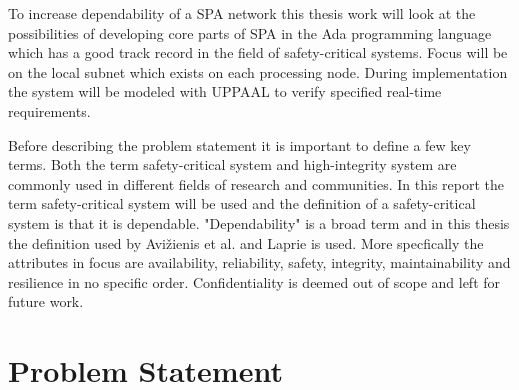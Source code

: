 
To increase dependability of a SPA network this thesis work will look at the
possibilities of developing core parts of SPA in the Ada programming language
which has a good track record in the field of safety-critical systems. Focus
will be on the local subnet which exists on each processing node.
During implementation the system will be modeled with UPPAAL to verify
specified real-time requirements.

Before describing the problem statement it is important to define a few key
terms. Both the term safety-critical system and high-integrity system are
commonly used in different fields of research and communities. In this report
the term safety-critical system will be used and the definition of a
safety-critical system is that it is dependable.  "Dependability" is a broad
term and in this thesis the definition used by Avi\v{z}ienis et al.
\cite{avizienis2004} and Laprie \cite{laprie2008} is used. More specfically the
attributes in focus are availability, reliability, safety, integrity,
maintainability and resilience in no specific order. Confidentiality is deemed
out of scope and left for future work.

\section{Problem Statement}
% 
% 

